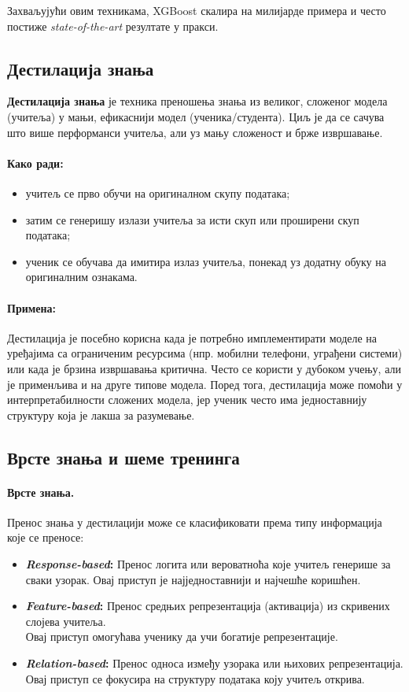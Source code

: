 Захваљујући овим техникама, XGBoost скалира на милијарде примера и често постиже \textit{state-of-the-art} резултате у пракси. \cite{chen2016xgboost}

\subsection{Дестилација знања}

\textbf{Дестилација знања} је техника преношења знања из великог, сложеног модела (учитеља) у мањи, ефикаснији модел (ученика/студента). Циљ је да се сачува што више перформанси учитеља, али уз мању сложеност и брже извршавање.

\paragraph{Како ради:}
\begin{itemize}
  \item учитељ се прво обучи на оригиналном скупу података;
  \item затим се генеришу излази учитеља за исти скуп или проширени скуп података;
  \item ученик се обучава да имитира излаз учитеља, понекад уз додатну обуку на оригиналним ознакама.
\end{itemize}

\paragraph{Примена:}
Дестилација је посебно корисна када је потребно имплементирати моделе на уређајима са ограниченим ресурсима (нпр. мобилни телефони, уграђени системи) или када је брзина извршавања критична. Често се користи у дубоком учењу, али је применљива и на друге типове модела. Поред тога, дестилација може помоћи у интерпретабилности сложених модела, јер ученик често има једноставнију структуру која је лакша за разумевање. \cite{hinton2015distilling}

\subsection{Врсте знања и шеме тренинга}

\paragraph{Врсте знања.}
Пренос знања у дестилацији може се класификовати према типу информација које се преносе:
\begin{itemize}
  \item \textbf{\emph{Response-based}:} Пренос логита или вероватноћа које учитељ генерише за сваки узорак. Овај приступ је најједноставнији и најчешће коришћен.
  \item \textbf{\emph{Feature-based}:} Пренос средњих репрезентација (активација) из скривених слојева учитеља.\\
  Овај приступ омогућава ученику да учи богатије репрезентације.
  \item \textbf{\emph{Relation-based}:} Пренос односа између узорака или њихових репрезентација. Овај приступ се фокусира на структуру података коју учитељ открива.
\end{itemize}

